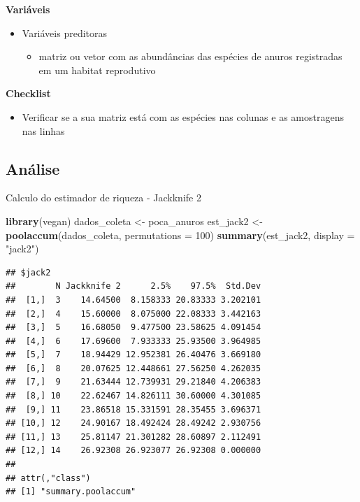 \documentclass[
]{book}
\newenvironment{Shaded}{\begin{snugshade}}{\end{snugshade}}
\newcommand{\DataTypeTok}[1]{\textcolor[rgb]{0.13,0.29,0.53}{#1}}
\newcommand{\DecValTok}[1]{\textcolor[rgb]{0.00,0.00,0.81}{#1}}
\newcommand{\KeywordTok}[1]{\textcolor[rgb]{0.13,0.29,0.53}{\textbf{#1}}}
\newcommand{\NormalTok}[1]{#1}
\newcommand{\StringTok}[1]{\textcolor[rgb]{0.31,0.60,0.02}{#1}}
\providecommand{\tightlist}{%
  \setlength{\itemsep}{0pt}\setlength{\parskip}{0pt}}
\begin{document}
\textbf{Variáveis}

\begin{itemize}
\tightlist
\item
  Variáveis preditoras

  \begin{itemize}
  \tightlist
  \item
    matriz ou vetor com as abundâncias das espécies de anuros registradas em um habitat reprodutivo
  \end{itemize}
\end{itemize}

\textbf{Checklist}

\begin{itemize}
\tightlist
\item
  Verificar se a sua matriz está com as espécies nas colunas e as amostragens nas linhas
\end{itemize}

\hypertarget{anuxe1lise-4}{%
\subsection{Análise}\label{anuxe1lise-4}}

Calculo do estimador de riqueza - Jackknife 2

\begin{Shaded}
\begin{Highlighting}[]
\KeywordTok{library}\NormalTok{(vegan)}
\NormalTok{dados_coleta <-}\StringTok{ }\NormalTok{poca_anuros}
\NormalTok{est_jack2 <-}\StringTok{ }\KeywordTok{poolaccum}\NormalTok{(dados_coleta, }\DataTypeTok{permutations =} \DecValTok{100}\NormalTok{)}
\KeywordTok{summary}\NormalTok{(est_jack2, }\DataTypeTok{display =} \StringTok{"jack2"}\NormalTok{)}
\end{Highlighting}
\end{Shaded}

\begin{verbatim}
## $jack2
##        N Jackknife 2      2.5%    97.5%  Std.Dev
##  [1,]  3    14.64500  8.158333 20.83333 3.202101
##  [2,]  4    15.60000  8.075000 22.08333 3.442163
##  [3,]  5    16.68050  9.477500 23.58625 4.091454
##  [4,]  6    17.69600  7.933333 25.93500 3.964985
##  [5,]  7    18.94429 12.952381 26.40476 3.669180
##  [6,]  8    20.07625 12.448661 27.56250 4.262035
##  [7,]  9    21.63444 12.739931 29.21840 4.206383
##  [8,] 10    22.62467 14.826111 30.60000 4.301085
##  [9,] 11    23.86518 15.331591 28.35455 3.696371
## [10,] 12    24.90167 18.492424 28.49242 2.930756
## [11,] 13    25.81147 21.301282 28.60897 2.112491
## [12,] 14    26.92308 26.923077 26.92308 0.000000
## 
## attr(,"class")
## [1] "summary.poolaccum"
\end{verbatim}
\end{document}
